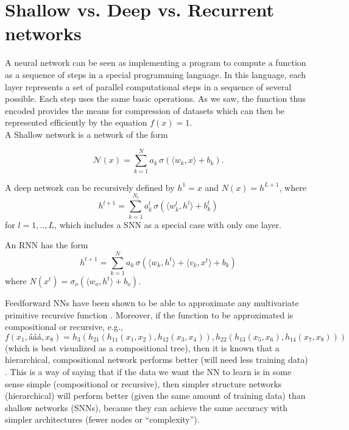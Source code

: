 \documentclass[11pt]{amsart}
\begin{document}
\section{Shallow vs. Deep vs. Recurrent networks}
A neural network can be seen as implementing a program to compute a function as a sequence of steps in a special programming language. In this language,  each layer represents a set of parallel computational steps in a sequence of several possible.  Each step uses the same basic operations.  As we saw, the function thus encoded provides the means for compression of datasets which can then be represented efficiently by the equation $f(x)=1$. \\


A Shallow network is a network of the form \cite{Mhaskar:2016aa}

$$
\mathcal N (x) = \sum_{k=1}^{N} a_{k}\,  \sigma( \langle w_{k}  , x \rangle+ b_{k} ) .
$$

A deep network can be recursively defined by $h^{1}=x$ and  $N (x) = h^{L+1}$, where  
$$
 h^{l+1} =   \sum_{k=1}^{N_{l}} a_{k}^{l} \, \sigma( \langle w_{k}^{l} , h^{l}\rangle + b_{k}^{l} )  
$$
for $l=1,..,L$, which includes a SNN as a special case with only one layer. 

An RNN has the form
$$
h^{t+1} =   \sum_{k=1}^{N} a_{k} \, \sigma( \langle w_{k} , h^{t}\rangle  + \langle v_{k} , x^{t}\rangle + b_{k} )  
$$
where   $N (x^{t}) = \sigma_{o} (\langle w_{o}, h^{t} \rangle +b_{o}).$
\medskip

Feedforward NNs  have been shown to be able to approximate any multivariate primitive recursive function \cite{Cybenko:1989aa, Hornik:1991aa}. Moreover,  if the function to be approximated is compositional 
or recursive,   e.g., 
$$
f(x_1, á á á , x_8) = h_3 \left(h_{21} \left(h_{11} \left(x_1, x_2\right), h_{12}\left(x_3, x_4\right)\right), h_{22}\left(h_{13}\left(x_5, x_6\right), h_{14}\left(x_7, x_8\right)\right) \right)
$$
(which is best visualized as a compositional tree), then it is known that a  hierarchical, compositional  network performs better (will need less training data) \cite{Mhaskar:2016aa}. This is a way of saying that if the data we want the NN to learn is in some sense simple (compositional or recursive), then simpler structure networks (hierarchical) will perform better  (given the same amount of training data) than shallow networks (SNNs), because they can achieve the same accuracy with simpler architectures (fewer nodes or ``complexity'').  \\
\end{document}
